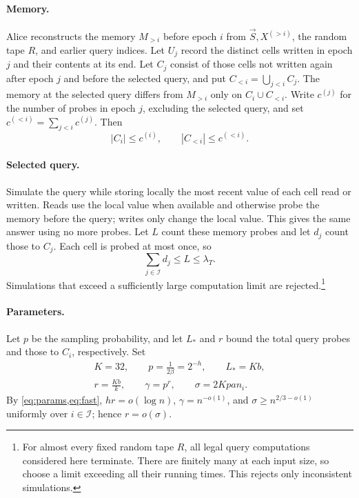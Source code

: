 \documentclass[11pt]{article}
\theoremstyle{plain}
\newcommand{\cI}{\mathcal{I}}
\newcommand{\vS}{\vec{S}}
\begin{document}
\paragraph{Memory.}
Alice reconstructs the memory $M_{>i}$ before epoch $i$ from
$\vS,X^{(>i)}$, the random tape $R$, and earlier query indices.
Let $U_j$ record the distinct cells written in epoch $j$ and their
contents at its end. Let $C_j$ consist of those cells not written again
after epoch $j$ and before the selected query, and put
$C_{<i}=\bigcup_{j<i}C_j$.
The memory at the selected query differs from $M_{>i}$ only on
$C_i\cup C_{<i}$.
Write $c^{(j)}$ for the number of probes in epoch $j$, excluding the
selected query, and set $c^{(<i)}=\sum_{j<i}c^{(j)}$. Then
\[
 |C_i|\le c^{(i)},\qquad |C_{<i}|\le c^{(<i)}.
\]

\paragraph{Selected query.}
Simulate the query while storing locally the most recent value of
each cell read or written. Reads use the local value when available
and otherwise probe the memory before the query; writes only change
the local value. This gives the same answer using no more probes.
Let $L$ count these memory probes and let $d_j$ count those to $C_j$.
Each cell is probed at most once, so
\[
 \sum_{j\in\cI}d_j\le L\le\lambda_T.
\]
Simulations that exceed a sufficiently large computation limit are
rejected.\footnote{For almost every fixed random tape $R$, all legal query
computations considered here terminate. There are finitely many at
each input size, so choose a limit exceeding all their running times.
This rejects only inconsistent simulations.}

\paragraph{Parameters.}
Let $p$ be the sampling probability, and let $L_*$ and $r$ bound the
total query probes and those to $C_i$, respectively. Set
\begin{equation}\label{eq:sample-params}
 \begin{gathered}
 K=32,\qquad p=\frac1{2\beta}=2^{-h},\qquad L_*=Kb,\\
 r=\frac{Kb}{k},\qquad \gamma=p^r,\qquad \sigma=2Kpa n_i.
 \end{gathered}
\end{equation}
By \cref{eq:params,eq:fast}, $hr=o(\log n)$,
$\gamma=n^{-o(1)}$, and $\sigma\ge n^{2/3-o(1)}$ uniformly over
$i\in\cI$; hence $r=o(\sigma)$.
\end{document}
